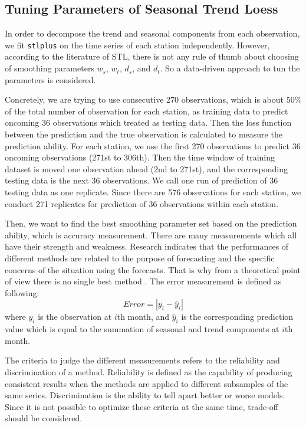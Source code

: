 \subsection{Tuning Parameters of Seasonal Trend Loess}

In order to decompose the trend and seasonal components from each observation, we 
fit \texttt{stlplus} on the time series of each station independently. However,
according to the literature of STL, there is not any rule of thumb about choosing 
of smoothing parameters $w_s$, $w_t$, $d_s$, and $d_t$. So a data-driven approach 
to tun the parameters is considered. 

Concretely, we are trying to use consecutive 270 observations, which is about 
50\% of the total number of observation for each station, as training 
data to predict oncoming 36 observations which treated as testing data. Then the 
loss function between the prediction and the true observation is calculated to 
measure the prediction ability. For each station, we use the first 270 
observations to predict 36 oncoming observations (271st to 306th). Then the time 
window of training dataset is moved one observation ahead (2nd to 271st), and 
the corresponding testing data is the next 36 observations. We call one run of 
prediction of 36 testing data as one replicate. Since there are 576 observations 
for each station, we conduct 271 replicates for prediction of 36 observations 
within each station.

Then, we want to find the best smoothing parameter set based on the prediction 
ability, which is accuracy measurement. 
There are many measurements which all have their strength and weakness. 
Research indicates that the performances of different methods are related to the
purpose of forecasting and the specific concerns of the situation using the 
forecasts. 
That is why from a theoretical point of view there is no single best method 
\cite{brockwell2002introduction}. The error measurement is defined as following:
\begin{equation} 
Error = | y_i - \hat y_i |
\end{equation} 
where $y_i$ is the observation at $i$th month, and $\hat y_i$ is the corresponding
prediction value which is equal to the summation of seasonal and trend components 
at $i$th month.

The criteria to judge the different measurements refers to the reliability and
discrimination of a method. Reliability is defined as the capability of producing 
consistent results when the methods are applied to different subsamples of the 
same series. Discrimination is the ability to tell apart better or worse models. 
Since it is not possible to optimize these criteria at the same time, trade-off 
should be considered.

